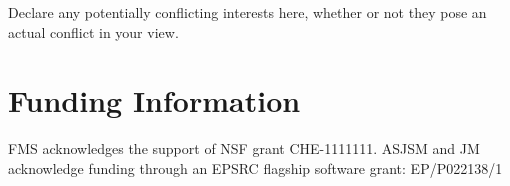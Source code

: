 \documentclass[9pt,bestpractices]{livecoms}
\begin{document}
Declare any potentially conflicting interests here, whether or not they pose an actual conflict in your view.

\section*{Funding Information}
FMS acknowledges the support of NSF grant CHE-1111111.
ASJSM and JM acknowledge funding through an EPSRC flagship software grant: EP/P022138/1




\end{document}
